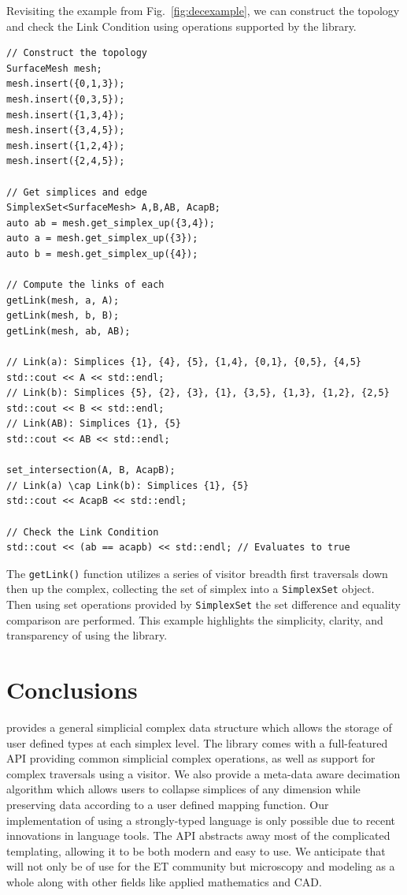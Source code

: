     \par Revisiting the example from Fig.~\ref{fig:decexample}, we can construct the topology and check the Link Condition using operations supported by the \asc library.
\begin{lstlisting}
// Construct the topology
SurfaceMesh mesh;
mesh.insert({0,1,3});
mesh.insert({0,3,5});
mesh.insert({1,3,4});
mesh.insert({3,4,5});
mesh.insert({1,2,4});
mesh.insert({2,4,5});

// Get simplices and edge
SimplexSet<SurfaceMesh> A,B,AB, AcapB;
auto ab = mesh.get_simplex_up({3,4});
auto a = mesh.get_simplex_up({3});
auto b = mesh.get_simplex_up({4});

// Compute the links of each
getLink(mesh, a, A);
getLink(mesh, b, B);
getLink(mesh, ab, AB);

// Link(a): Simplices {1}, {4}, {5}, {1,4}, {0,1}, {0,5}, {4,5}
std::cout << A << std::endl;
// Link(b): Simplices {5}, {2}, {3}, {1}, {3,5}, {1,3}, {1,2}, {2,5}
std::cout << B << std::endl;
// Link(AB): Simplices {1}, {5}
std::cout << AB << std::endl;

set_intersection(A, B, AcapB);
// Link(a) \cap Link(b): Simplices {1}, {5}
std::cout << AcapB << std::endl;

// Check the Link Condition
std::cout << (ab == acapb) << std::endl; // Evaluates to true
\end{lstlisting}
    The \verb|getLink()| function utilizes a series of visitor breadth first traversals down then up the complex, collecting the set of simplex into a \verb|SimplexSet| object.
    Then using set operations provided by \verb|SimplexSet| the set difference and equality comparison are performed.
    This example highlights the simplicity, clarity, and transparency of using the \asc library.

\section{Conclusions}

\par \asc provides a general simplicial complex data structure which allows the storage of user defined types at each simplex level.
The library comes with a full-featured API providing common simplicial complex operations, as well as support for complex traversals using a visitor.
We also provide a meta-data aware decimation algorithm which allows users to collapse simplices of any dimension while preserving data according to a user defined mapping function.
Our implementation of \asc using a strongly-typed language is only possible due to recent innovations in language tools.
The \asc API abstracts away most of the complicated templating, allowing it to be both modern and easy to use.
We anticipate that \asc will not only be of use for the ET community but microscopy and modeling as a whole along with other fields like applied mathematics and CAD.

